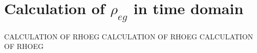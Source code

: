 \chapter{Calculation of $\rho_{eg}$ in time domain}

CALCULATION OF RHOEG 
\vspace{2cm}
CALCULATION OF RHOEG 
\vspace{2cm}
CALCULATION OF RHOEG 
